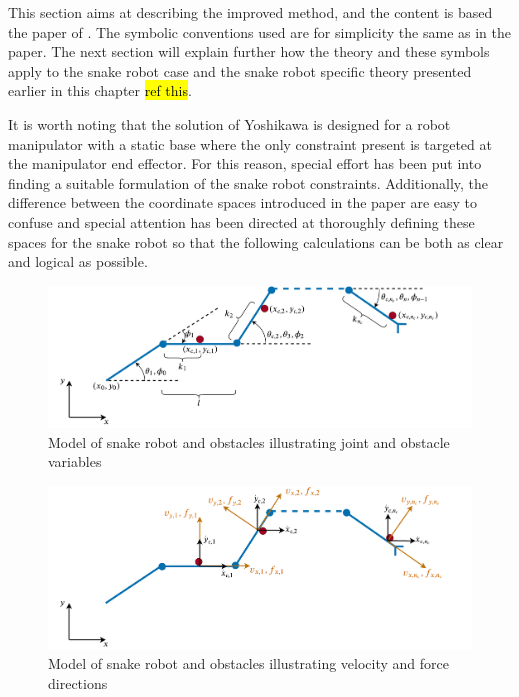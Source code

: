 This section aims at describing the improved method, and the content is based the paper of \cite{yoshikawa1987dynamic}. The symbolic conventions used are for simplicity the same as in the paper. The next section will explain further how the theory and these symbols apply to the snake robot case and the snake robot specific theory presented earlier in this chapter \hl{ref this}.

It is worth noting that the solution of Yoshikawa is designed for a robot manipulator with a static base where the only constraint present is targeted at the manipulator end effector. For this reason, special effort has been put into finding a suitable formulation of the snake robot constraints. Additionally, the difference between the coordinate spaces introduced in the paper are easy to confuse and special attention has been directed at thoroughly defining these spaces for the snake robot so that the following calculations can be both as clear and logical as possible.

\begin{figure}
    \centering
    \includegraphics[width=\textwidth]{figures/theory/dhpfc_robot.pdf}
    \caption{Model of snake robot and obstacles illustrating joint and obstacle variables}
    \label{fig:dhpfc_robot1}
\end{figure}
\begin{figure}
    \centering
    \includegraphics[width=\textwidth]{figures/theory/dhpfc_robot_2.pdf}
    \caption{Model of snake robot and obstacles illustrating velocity and force directions}
    \label{fig:dhpfc_robot2}
\end{figure}

